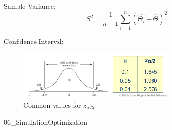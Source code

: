 Sample Variance:
\begin{equation}
S^2 = \frac{1}{n-1}\sum_{i=1}^n (\hat{\Theta_i} - \hat{\Theta})^2
\end{equation}

Confidence Interval:
\begin{equation}
[\hat{\Theta}-z_{\alpha/2}\cdot \sqrt{S^2/n};
\hat{\Theta}+z_{\alpha/2}\cdot \sqrt{S^2/n}]
\end{equation}

\begin{figure}[H]
	\centering
	\includegraphics[width=0.7\textwidth]{figures/ConfidenceIntervalValues.png}
	\caption{Common values for $z_{\alpha/2}$}
\end{figure}




{06_SimulationOptimization}
